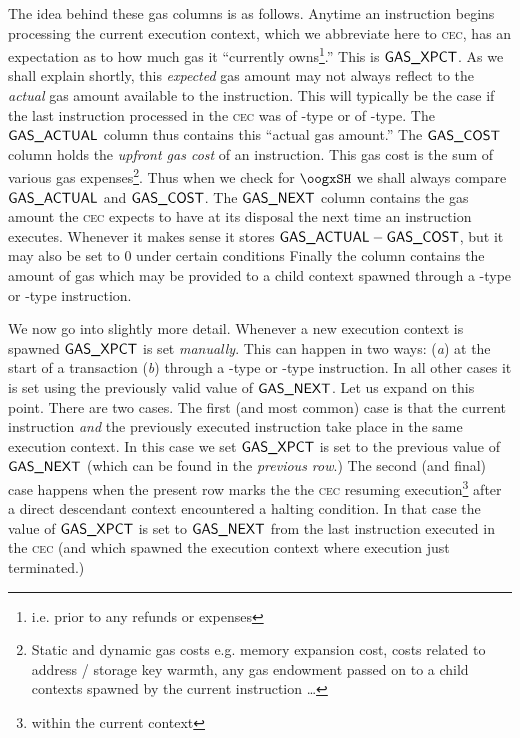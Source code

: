 The idea behind these gas columns is as follows.
Anytime an instruction begins processing the current execution context, which we abbreviate here to \textsc{cec}, has an expectation as to how much gas it ``currently owns\footnote{i.e. prior to any refunds or expenses}.''
This is $\textsf{GAS}\textsf{\_XPCT}$.
As we shall explain shortly, this \emph{expected} gas amount may not always reflect to the \emph{actual} gas amount available to the instruction.
This will typically be the case if the last instruction processed in the \textsc{cec} was of -type or of -type.
The $\textsf{GAS}\textsf{\_ACTUAL}$ column thus contains this ``actual gas amount.''
The $\textsf{GAS}\textsf{\_COST}$ column holds the \emph{upfront gas cost} of an instruction.
This gas cost is the sum of various gas expenses\footnote{Static and dynamic gas costs e.g. memory expansion cost, costs related to address / storage key warmth, any gas endowment passed on to a child contexts spawned by the current instruction \dots{}}.
Thus when we check for $\oogxSH$ we shall always compare $\textsf{GAS}\textsf{\_ACTUAL}$ and $\textsf{GAS}\textsf{\_COST}$.
The $\textsf{GAS}\textsf{\_NEXT}$ column contains the gas amount the \textsc{cec} expects to have at its disposal the next time an instruction executes.
Whenever it makes sense it stores $\textsf{GAS}\textsf{\_ACTUAL}- \textsf{GAS}\textsf{\_COST}$, but it may also be set to 0 under certain conditions
Finally the \gasStipend{} column contains the amount of gas which may be provided to a child context spawned through a -type or -type instruction. 

We now go into slightly more detail. Whenever a new execution context is spawned $\textsf{GAS}\textsf{\_XPCT}$ is set \emph{manually}. This can happen in two ways: 
(\emph{a}) at the start of a transaction
(\emph{b}) through a -type or -type instruction.
In all other cases it is set using the previously valid value of $\textsf{GAS}\textsf{\_NEXT}$. Let us expand on this point. There are two cases.
The first (and most common) case is that the current instruction \emph{and} the previously executed instruction take place in the same execution context.
In this case we set $\textsf{GAS}\textsf{\_XPCT}$ is set to the previous value of $\textsf{GAS}\textsf{\_NEXT}$ (which can be found in the \emph{previous row}.)
The second (and final) case happens when the present row marks the the \textsc{cec} resuming execution\footnote{within the current context} after a direct descendant context encountered a halting condition.
In that case the value of $\textsf{GAS}\textsf{\_XPCT}$ is set to $\textsf{GAS}\textsf{\_NEXT}$ from the last instruction executed in the \textsc{cec} (and which spawned the execution context where execution just terminated.)

